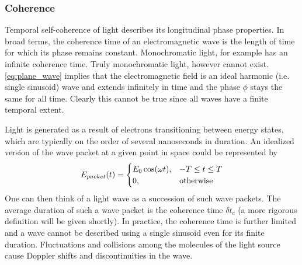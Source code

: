 \subsubsection{Coherence}
Temporal self-coherence of light describes its longitudinal phase properties. In broad terms, the coherence time of an electromagnetic wave is the length of time for which its phase remains constant. Monochromatic light, for example has an infinite coherence time. Truly monochromatic light, however cannot exist. \autoref{eq:plane_wave} implies that the electromagnetic field is an ideal harmonic (i.e. single sinusoid) wave and extends infinitely in time and the phase $\phi$ stays the same for all time. Clearly this cannot be true since all waves have a finite temporal extent. 

Light is generated as a result of electrons transitioning between energy states, which are typically on the order of several nanoseconds in duration. An idealized version of the wave packet at a given point in space could be represented by
\begin{align}\label{eq:wavepacket}
E_{packet}(t) = 
\begin{cases}
E_0\cos(\omega t), & -T \leq t \leq T \\
0, &\textnormal{otherwise}
\end{cases}
\end{align}
One can then think of a light wave as a succession of such wave packets. The average duration of such a wave packet is the coherence time $\delta t_c$ (a more rigorous definition will be given shortly). In practice, the coherence time is further limited and a wave cannot be described using a single sinusoid even for its finite duration. Fluctuations and collisions among the molecules of the light source cause Doppler shifts and discontinuities in the wave.

